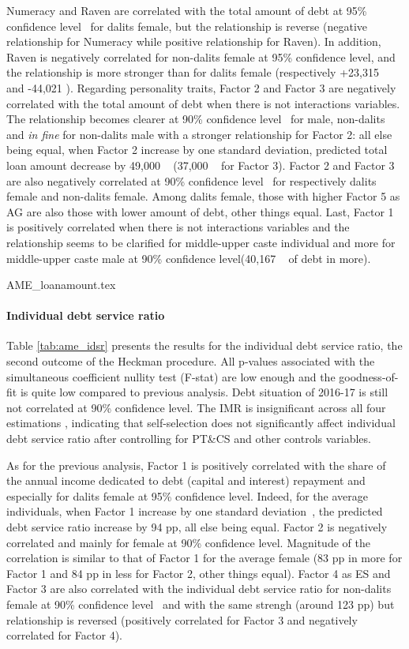 \documentclass[a4paper, 11pt, onecolumn]{article}
\newcommand{\sd}{standard deviation}
\newcommand{\aebe}{all else being equal}
\newcommand{\ote}{other things equal}
\newcommand{\cl}{confidence level}
\begin{document}
Numeracy and Raven are correlated with the total amount of debt at 95\% \cl~ for dalits female, but the relationship is reverse (negative relationship for Numeracy while positive relationship for Raven).
In addition, Raven is negatively correlated for non-dalits female at 95\% \cl, and the relationship is more stronger than for dalits female (respectively +23,315 \rupee~ and -44,021 \rupee).
Regarding personality traits, Factor 2 and Factor 3 are negatively correlated with the total amount of debt when there is not interactions variables.
The relationship becomes clearer at 90\% \cl~ for male, non-dalits and \textit{in fine} for non-dalits male with a stronger relationship for Factor 2: \aebe, when Factor 2 increase by one \sd, predicted total loan amount decrease by 49,000 \rupee~ (37,000 \rupee~ for Factor 3).
Factor 2 and Factor 3 are also negatively correlated at 90\% \cl~ for respectively dalits female and non-dalits female.
Among dalits female, those with higher Factor 5 as AG are also those with lower amount of debt, \ote.
Last, Factor 1 is positively correlated when there is not interactions variables and the relationship seems to be clarified for middle-upper caste individual and more for middle-upper caste male at 90\% \cl (40,167 \rupee~ of debt in more).
 

{AME_loanamount.tex}

\paragraph{Individual debt service ratio}
Table \ref{tab:ame_idsr} presents the results for the individual debt service ratio, the second outcome of the Heckman procedure.
All p-values associated with the simultaneous coefficient nullity test (F-stat) are low enough and the goodness-of-fit is quite low compared to previous analysis.
Debt situation of 2016-17 is still not correlated at 90\% \cl.
The IMR is insignificant across all four estimations , indicating that self-selection does not significantly affect individual debt service ratio after controlling for PT\&CS and other controls variables.

As for the previous analysis, Factor 1 is positively correlated with the share of the annual income dedicated to debt (capital and interest) repayment and especially for dalits female at 95\% \cl.
Indeed, for the average individuals, when Factor 1 increase by one \sd~, the predicted debt service ratio increase by 94 pp, \aebe.
Factor 2 is negatively correlated and mainly for female at 90\% \cl.
Magnitude of the correlation is similar to that of Factor 1 for the average female (83 pp in more for Factor 1 and 84 pp in less for Factor 2, \ote).
Factor 4 as ES and Factor 3 are also correlated with the individual debt service ratio for non-dalits female at 90\% \cl~ and with the same strengh (around 123 pp) but relationship is reversed (positively correlated for Factor 3 and negatively correlated for Factor 4).
\end{document}
